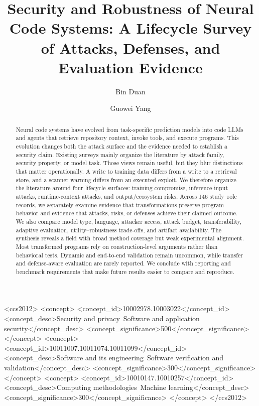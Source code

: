\documentclass[acmsmall,screen,review]{acmart}
\begin{document}
\title{Security and Robustness of Neural Code Systems: A Lifecycle Survey of Attacks, Defenses, and Evaluation Evidence}

\author{Bin Duan}
\author{Guowei Yang}

\begin{abstract}
Neural code systems have evolved from task-specific prediction models into code LLMs and agents that retrieve repository context, invoke tools, and execute programs. This evolution changes both the attack surface and the evidence needed to establish a security claim. Existing surveys mainly organize the literature by attack family, security property, or model task. Those views remain useful, but they blur distinctions that matter operationally. A write to training data differs from a write to a retrieval store, and a scanner warning differs from an executed exploit. We therefore organize the literature around four lifecycle surfaces: training compromise, inference-input attacks, runtime-context attacks, and output/ecosystem risks. Across 146 study--role records, we separately examine evidence that transformations preserve program behavior and evidence that attacks, risks, or defenses achieve their claimed outcome. We also compare model type, language, attacker access, attack budget, transferability, adaptive evaluation, utility--robustness trade-offs, and artifact availability. The synthesis reveals a field with broad method coverage but weak experimental alignment. Most transformed programs rely on construction-level arguments rather than behavioral tests. Dynamic and end-to-end validation remain uncommon, while transfer and defense-aware evaluation are rarely reported. We conclude with reporting and benchmark requirements that make future results easier to compare and reproduce.
\end{abstract}

\begin{CCSXML}
<ccs2012>
 <concept>
  <concept_id>10002978.10003022</concept_id>
  <concept_desc>Security and privacy~Software and application security</concept_desc>
  <concept_significance>500</concept_significance>
 </concept>
 <concept>
  <concept_id>10011007.10011074.10011099</concept_id>
  <concept_desc>Software and its engineering~Software verification and validation</concept_desc>
  <concept_significance>300</concept_significance>
 </concept>
 <concept>
  <concept_id>10010147.10010257</concept_id>
  <concept_desc>Computing methodologies~Machine learning</concept_desc>
  <concept_significance>300</concept_significance>
 </concept>
</ccs2012>
\end{CCSXML}
\end{document}
